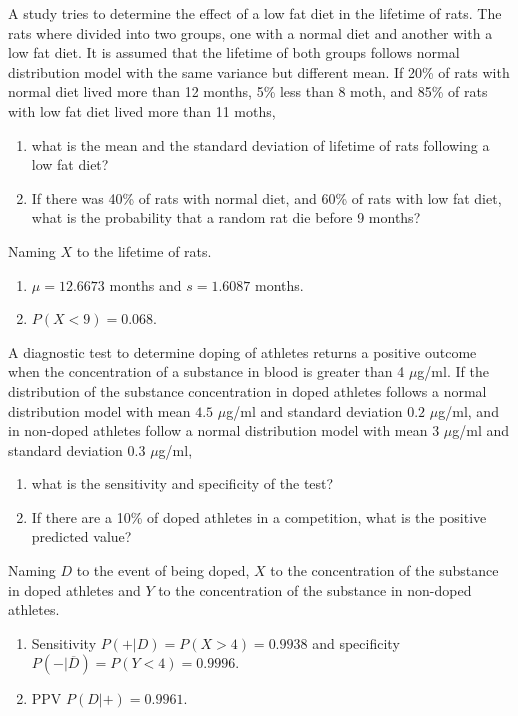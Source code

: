 {A study tries to determine the effect of a low fat diet in the lifetime of rats.
The rats where divided into two groups, one with a normal diet and another with a low fat diet.
It is assumed that the lifetime of both groups follows normal distribution model with the same variance but different
mean.
If 20\% of rats with normal diet lived more than 12 months, 5\% less than 8 moth, and 85\% of rats with low fat diet
lived more than 11 moths,
\begin{enumerate}
\item what is the mean and the standard deviation of lifetime of rats following a low fat diet?
\item If there was 40\% of rats with normal diet, and 60\% of rats with low fat diet, what is the probability that a
random rat die before 9 months?
\end{enumerate}
}
{Naming $X$ to the lifetime of rats. 
\begin{enumerate}
\item $\mu=12.6673$ months and $s=1.6087$ months. 
\item $P(X<9)=0.068$.
\end{enumerate}
}
{}


{A diagnostic test to determine doping of athletes returns a positive outcome when the concentration of a substance
in blood is greater than 4 $\mu$g/ml.
If the distribution of the substance concentration in doped athletes follows a normal distribution model with mean $4.5$
$\mu$g/ml and standard deviation $0.2$ $\mu$g/ml, and in non-doped athletes follow a normal distribution model with mean
$3$ $\mu$g/ml and standard deviation $0.3$ $\mu$g/ml, 
\begin{enumerate}
\item what is the sensitivity and specificity of the test?
\item If there are a 10\% of doped athletes in a competition, what is the positive predicted value? 
\end{enumerate}
}
{Naming $D$ to the event of being doped, $X$ to the concentration of the substance in doped athletes and $Y$ to the concentration of the substance in non-doped athletes.
\begin{enumerate}
\item Sensitivity $P(+|D)=P(X>4)=0.9938$ and specificity $P(-|\overline D)=P(Y<4)=0.9996$.
\item PPV $P(D|+)=0.9961$.
\end{enumerate}
}
{}